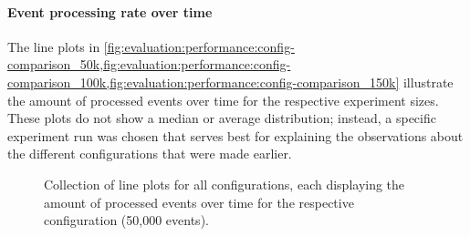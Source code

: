 \paragraph{Event processing rate over time}

The line plots in \cref{fig:evaluation:performance:config-comparison_50k,fig:evaluation:performance:config-comparison_100k,fig:evaluation:performance:config-comparison_150k} illustrate the amount of processed events over time for the respective experiment sizes.
These plots do not show a median or average distribution; instead, a specific experiment run was chosen that serves best for explaining the observations about the different configurations that were made earlier.

\begin{figure}[h]
        \caption{Collection of line plots for all configurations, each displaying the amount of processed events over time for the respective configuration (50,000 events).}
        \label{fig:evaluation:performance:config-comparison_50k}
\end{figure}


